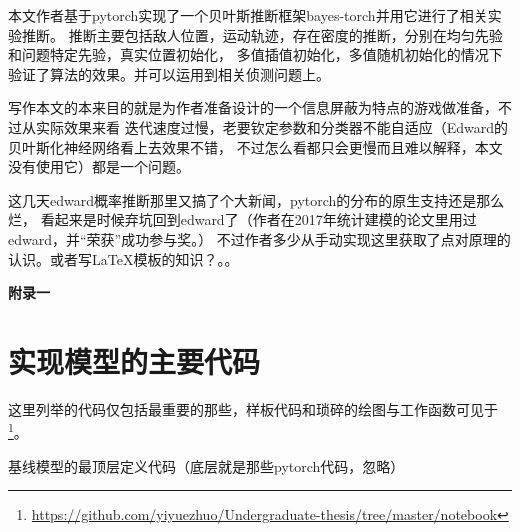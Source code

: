\documentclass{sicnuthesis}
\begin{document}
本文作者基于pytorch实现了一个贝叶斯推断框架bayes-torch并用它进行了相关实验推断。
推断主要包括敌人位置，运动轨迹，存在密度的推断，分别在均匀先验和问题特定先验，真实位置初始化，
多值插值初始化，多值随机初始化的情况下验证了算法的效果。并可以运用到相关侦测问题上。

写作本文的本来目的就是为作者准备设计的一个信息屏蔽为特点的游戏做准备，不过从实际效果来看
迭代速度过慢，老要钦定参数和分类器不能自适应（Edward的贝叶斯化神经网络看上去效果不错，
不过怎么看都只会更慢而且难以解释，本文没有使用它）都是一个问题。

这几天edward概率推断那里又搞了个大新闻，pytorch的分布的原生支持还是那么烂，
看起来是时候弃坑回到edward了（作者在2017年统计建模的论文\cite{touhou}里用过edward，并“荣获”成功参与奖。）
不过作者多少从手动实现这里获取了点对原理的认识。或者写LaTeX模板的知识？。。


% 
%



{\bf 附录一}

\section*{实现模型的主要代码}

这里列举的代码仅包括最重要的那些，样板代码和琐碎的绘图与工作函数可见于
\footnote{\url{https://github.com/yiyuezhuo/Undergraduate-thesis/tree/master/notebook}}。



基线模型的最顶层定义代码（底层就是那些pytorch代码，忽略）
\end{document}
